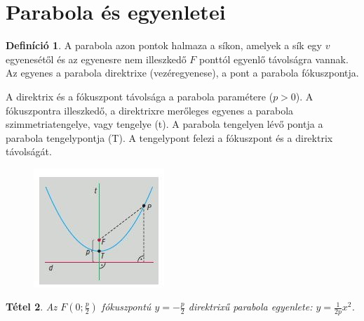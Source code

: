 \documentclass[twoside,12pt]{report}
\newtheorem{theorem}{Tétel}[section]
\theoremstyle{definition}
\newtheorem{definition}[theorem]{Definíció}
\begin{document}
\section{Parabola és egyenletei}
	\begin{definition}
		A parabola azon pontok halmaza a síkon, amelyek a sík egy $v$ egyenesétől és az egyenesre
		nem illeszkedő $F$ ponttól egyenlő távolságra vannak. Az egyenes a parabola direktrixe (vezéregyenese), a pont a parabola fókuszpontja.
	\end{definition}
	A direktrix és a fókuszpont távolsága a parabola paramétere ($p>0$). A fókuszpontra illeszkedő, a direktrixre merőleges egyenes a parabola szimmetriatengelye, vagy tengelye (t). A parabola tengelyen lévő pontja a parabola tengelypontja (T). A tengelypont felezi a fókuszpont és a direktrix távolságát.
	\begin{figure}[H]
		\centering
		\includegraphics[width=0.4\linewidth]{Par}
	\end{figure}
	\begin{theorem}
		Az $F\left(0;\frac{p}{2}\right)$ fókuszpontú $y=-\frac{p}{2}$ direktrixű parabola egyenlete: $y=\frac{1}{2p}x^2$.
	\end{theorem}
\end{document}
